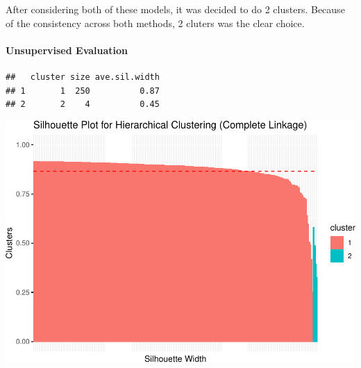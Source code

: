 \documentclass[
]{article}
\begin{document}
After considering both of these models, it was decided to do 2 clusters.
Because of the consistency across both methods, 2 cluters was the clear
choice.

\paragraph{Unsupervised Evaluation}\label{unsupervised-evaluation-1}

\begin{verbatim}
##   cluster size ave.sil.width
## 1       1  250          0.87
## 2       2    4          0.45
\end{verbatim}

\includegraphics{Final-Report_files/figure-latex/hierarchical silhouette analysis-1.pdf}
\end{document}
